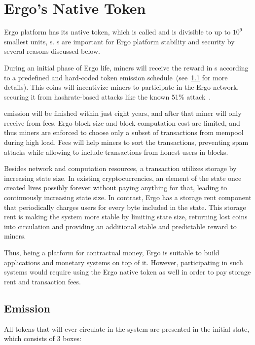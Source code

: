\section{Ergo's Native Token}
\label{sec:currency}

Ergo platform has its native token, which is
called \Erg{} and is divisible to up to $10^9$ smallest units, \nanoErg{}s.
\Erg{}s are important for Ergo platform stability and security by several reasons discussed below.

During an initial phase of Ergo life, miners will receive the reward in \Erg{}s
according to a predefined and hard-coded token emission schedule~(see~\ref{sec:emission} for more details).
This coins will incentivize miners to participate in the Ergo network, securing it from hashrate-based attacks
like the known 51\% attack~\cite{reorgAttack}.

\Erg{} emission will be finished within just eight years, and after that miner will only receive \Erg{} from
fees.
Ergo block size and block computation cost are limited, and thus miners are enforced to
choose only a subset of transactions from mempool during high load.
Fees will help miners to sort the transactions, preventing spam attacks while allowing
to include transactions from honest users in blocks.

Besides network and computation resources, a transaction utilizes storage by increasing state size.
In existing cryptocurrencies, an element of the state once created lives possibly forever without
paying anything for that, leading to continuously increasing state size.
In contrast, Ergo has a storage rent component that periodically charges users for every byte
included in the state.
This storage rent is making the system more stable by limiting state size, returning lost coins into
circulation and providing an additional stable and predictable reward to miners.

Thus, being a platform for contractual money, Ergo is suitable to build applications and monetary systems
on top of it.
However, participating in such systems would require using the Ergo native token as well in order to pay
storage rent and transaction fees.

\subsection{Emission}
\label{sec:emission}


All \Erg{} tokens that will ever circulate in the system are presented in the initial state, which consists of 3 boxes:

